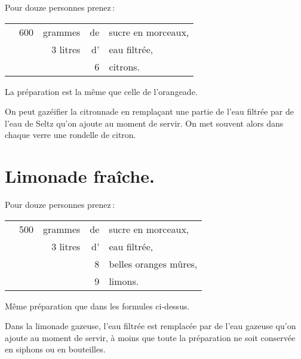 Pour douze personnes prenez :

\footnotesize
\begin{longtable}{rrrrp{16em}}
  & 600 & grammes & de & sucre en morceaux,                                                               \\
  & \multicolumn{2}{r}{3 litres} & d' & eau filtrée,                                                      \\
  &     &         &  6 & citrons.                                                                         \\
\end{longtable}
\normalsize

La préparation est la même que celle de l'orangeade.

\sk

On peut gazéifier la citronnade en remplaçant une partie de l’eau filtrée par
de l'eau de Seltz qu'on ajoute au moment de servir. On met souvent alors dans
chaque verre une rondelle de citron.

\section*{\centering Limonade fraîche.}
{}

Pour douze personnes prenez :

\footnotesize
\begin{longtable}{rrrrp{16em}}
  & 500 & grammes & de & sucre en morceaux,                                                               \\
  & \multicolumn{2}{r}{3 litres} & d' & eau filtrée,                                                      \\
  &     &         &  8 & belles oranges mûres,                                                            \\
  &     &         &  9 & limons.                                                                          \\
\end{longtable}
\normalsize

Même préparation que dans les formules ci-dessus.

\sk

Dans la limonade gazeuse, l'eau filtrée est remplacée par de l'eau gazeuse qu'on
ajoute au moment de servir, à moins que toute la préparation ne soit conservée en
siphons ou en bouteilles.

